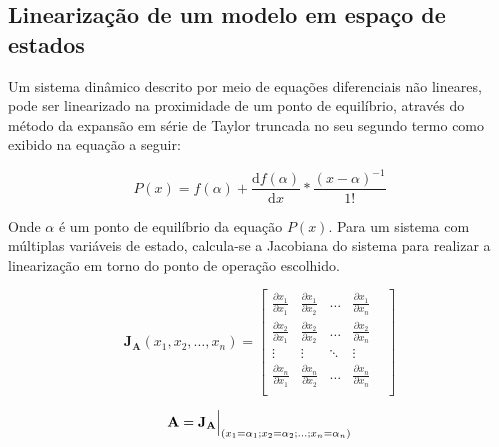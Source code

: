 \subsection{Linearização de um modelo em espaço de estados}
Um sistema dinâmico descrito por meio de equações diferenciais não lineares, pode ser linearizado na proximidade de um ponto de equilíbrio, através do método da expansão em série de Taylor truncada no seu segundo termo como exibido na equação a seguir:
    
\begin{equation}
        P(x) = f(\alpha) + \dfrac{\mathrm{d}f(\alpha)}{\mathrm{d}x}*\frac{(x-\alpha)^{-1}}{1!}    
\end{equation}
    
Onde $\alpha$ é um ponto de equilíbrio da equação $P(x)$.  
Para um sistema com múltiplas variáveis de estado, calcula-se a Jacobiana do sistema para realizar a linearização em torno do ponto de operação escolhido.  
    
\begin{equation} \label{eq:Jacobian_A}
    \mathbf{J_A}(x_1,x_2,\dots,x_n) =
    \begin{bmatrix}
        \frac{\partial x_1}{\partial x_1} & 
        \frac{\partial x_1}{\partial x_2} & 
        \dots &
        \frac{\partial x_1}{\partial x_n} &\\[1ex]
        \frac{\partial x_2}{\partial x_1} & 
        \frac{\partial x_2}{\partial x_2} & 
        \dots &
        \frac{\partial x_2}{\partial x_n} &\\[1ex]
        \vdots & 
        \vdots & 
        \ddots &
        \vdots &\\[1ex]
        \frac{\partial x_n}{\partial x_1} & 
        \frac{\partial x_n}{\partial x_2} & 
        \dots &
        \frac{\partial x_n}{\partial x_n} &\\[1ex]
    \end{bmatrix}
\end{equation}
    
    \begin{equation} \label{eq:eval_A}
        \mathbf{A=J_A} \Bigr\rvert_{(x_1=\alpha_1;x_2=\alpha_2;\dots;x_n=\alpha_n)} \\
    \end{equation}
    
